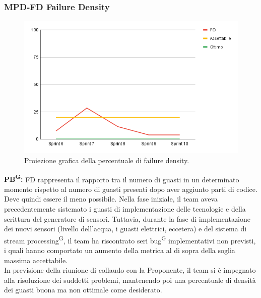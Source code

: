 \documentclass[8pt]{article}
\newcommand{\glossterm}[1]{#1\textsuperscript{G}} %
\begin{document}
\subsubsection{MPD-FD Failure Density}
\begin{figure}[h!]
    \centering
    \includegraphics[width=1\textwidth]{images_pdq/FD.png}
    \caption{Proiezione grafica della percentuale di failure density.}
    \label{fig:Proiezione grafica della percentuale di failure density}
\end{figure}
\textbf{\glossterm{PB}:} FD rappresenta il rapporto tra il numero di guasti in un determinato momento rispetto al numero di guasti presenti dopo aver aggiunto parti di codice. Deve quindi essere il meno possibile. Nella fase iniziale, il team aveva precedentemente sistemato i guasti di implementazione delle tecnologie e della scrittura del generatore di sensori. Tuttavia, durante la fase di implementazione dei nuovi sensori (livello dell'acqua, i guasti elettrici, eccetera) e del sistema di \glossterm{stream processing}, il team ha riscontrato seri \glossterm{bug} implementativi non previsti, i quali hanno comportato un aumento della metrica al di sopra della soglia massima accettabile.\\ In previsione della riunione di collaudo con la Proponente, il team si è impegnato alla risoluzione dei suddetti problemi, mantenendo poi una percentuale di densità dei guasti buona ma non ottimale come desiderato.
\clearpage
\end{document}
